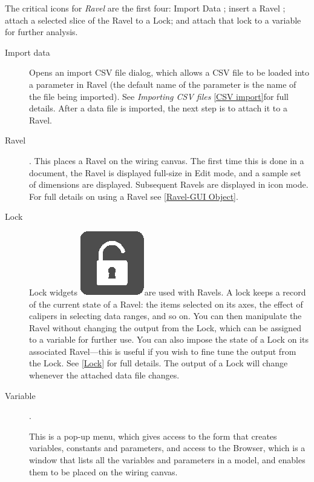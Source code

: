 The critical icons for \emph{Ravel} are the first four: Import Data
; insert a Ravel ;
attach a selected slice of the Ravel to a Lock; and attach that lock
to a variable for further analysis.
\begin{description}
\item [{Import data}]  Opens an import CSV
file dialog, which allows a CSV file to be loaded into a parameter
in Ravel (the default name of the parameter is the name of the file
being imported). See \emph{Importing CSV files} \ref{CSV import}for
full details. After a data file is imported, the next step is to attach
it to a Ravel.
\item [{Ravel}] . This places a Ravel on the
wiring canvas. The first time this is done in a document, the Ravel
is displayed full-size in Edit mode, and a sample set of dimensions
are displayed. Subsequent Ravels are displayed in icon mode. For full
details on using a Ravel see \ref{Ravel-GUI Object}.
\item [{Lock}] Lock widgets \includegraphics{images/Lock}are used with
Ravels. A lock keeps a record of the current state of a Ravel: the
items selected on its axes, the effect of calipers in selecting data
ranges, and so on. You can then manipulate the Ravel without changing
the output from the Lock, which can be assigned to a variable for
further use. You can also impose the state of a Lock on its associated
Ravel---this is useful if you wish to fine tune the output from the
Lock. See \ref{Lock} for full details. The output of a Lock will
change whenever the attached data file changes.
\item [{Variable}] . \label{Variable}

This is a pop-up menu, which gives access to the form that creates
variables, constants and parameters, and access to the Browser, which
is a window that lists all the variables and parameters in a model,
and enables them to be placed on the wiring canvas.


\end{description}
